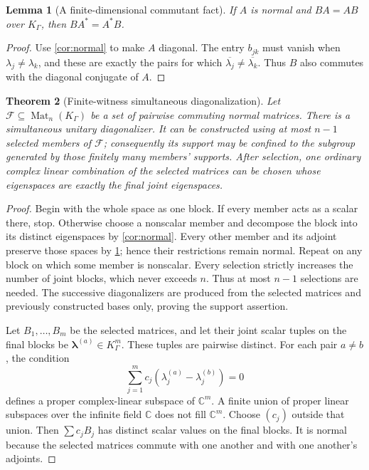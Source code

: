 \documentclass[11pt,letterpaper]{article}
\numberwithin{equation}{section}
\newtheorem{theorem}{Theorem}[section]
\newtheorem{lemma}[theorem]{Lemma}
\theoremstyle{definition}
\theoremstyle{remark}
\newcommand{\C}{\mathbb C}
\newcommand{\Mat}{\operatorname{Mat}}
\newcommand{\KG}{K_{\Gamma}}
\begin{document}
\begin{lemma}[A finite-dimensional commutant fact]\label{lem:commutant}
If $A$ is normal and $BA=AB$ over $\KG$, then $BA^*=A^*B$.
\end{lemma}
\begin{proof}
Use \cref{cor:normal} to make $A$ diagonal. The entry $b_{jk}$ must vanish
when $\lambda_j\ne\lambda_k$, and these are exactly the pairs for which
$\overline{\lambda_j}\ne\overline{\lambda_k}$. Thus $B$ also commutes with
the diagonal conjugate of $A$.
\end{proof}

\begin{theorem}[Finite-witness simultaneous diagonalization]\label{thm:simultaneous}
Let $\mathcal F\subseteq\Mat_n(\KG)$ be a set of pairwise commuting normal
matrices. There is a simultaneous unitary diagonalizer. It can be constructed
using at most $n-1$ selected members of $\mathcal F$; consequently its support
may be confined to the subgroup generated by those finitely many members'
supports. After selection, one ordinary complex linear combination of the
selected matrices can be chosen whose eigenspaces are exactly the final
joint eigenspaces.
\end{theorem}
\begin{proof}
Begin with the whole space as one block. If every member acts as a scalar
there, stop. Otherwise choose a nonscalar member and decompose the block
into its distinct eigenspaces by \cref{cor:normal}. Every other member and
its adjoint preserve those spaces by \cref{lem:commutant}; hence their
restrictions remain normal. Repeat on any block on which some member is
nonscalar. Every selection strictly increases the number of joint blocks,
which never exceeds $n$. Thus at most $n-1$ selections are needed. The
successive diagonalizers are produced from the selected matrices and
previously constructed bases only, proving the support assertion.

Let $B_1,\ldots,B_m$ be the selected matrices, and let their joint scalar
tuples on the final blocks be $\boldsymbol\lambda^{(a)}\in\KG^m$. These
tuples are pairwise distinct. For each pair $a\ne b$, the condition
\[
 \sum_{j=1}^m c_j(\lambda_j^{(a)}-\lambda_j^{(b)})=0
\]
defines a proper complex-linear subspace of $\C^m$. A finite union of proper
linear subspaces over the infinite field $\C$ does not fill $\C^m$. Choose
$(c_j)$ outside that union. Then $\sum c_jB_j$ has distinct scalar values
on the final blocks. It is normal because the selected matrices commute
with one another and with one another's adjoints.
\end{proof}
\end{document}
